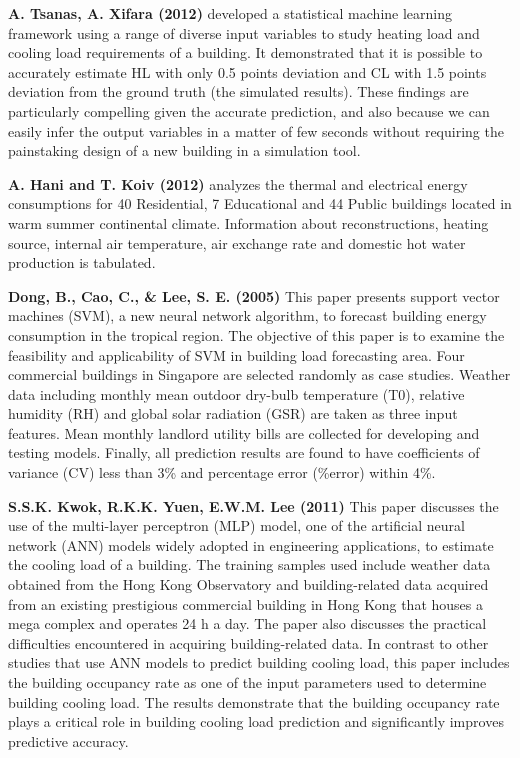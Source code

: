\textbf{A. Tsanas, A. Xifara (2012)} \cite{sanas2012xifara} developed a statistical machine learning framework using a range of diverse input variables to study heating load and cooling load requirements of a building. It demonstrated that it is possible to accurately estimate HL with only 0.5 points deviation and CL with 1.5 points deviation from the ground truth (the simulated results). These findings are particularly compelling given the accurate prediction, and also because we can easily infer the output variables in a matter of few seconds without requiring the painstaking design of a new building in a simulation tool.

\textbf{A. Hani and T. Koiv (2012)} \cite{hani2012koiv} analyzes the thermal and electrical energy consumptions for 40 Residential, 7 Educational and 44 Public buildings located in warm summer continental climate. Information about reconstructions, heating source, internal air temperature, air exchange rate and domestic hot water production is tabulated.

\textbf{Dong, B., Cao, C., \& Lee, S. E. (2005)} \cite{dong2005cao} This paper presents support vector machines (SVM), a new neural network algorithm, to forecast building energy consumption in the tropical region. The objective of this paper is to examine the feasibility and applicability of SVM in building load forecasting area. Four commercial buildings in Singapore are selected randomly as case studies. Weather data including monthly mean outdoor dry-bulb temperature (T0), relative humidity (RH) and global solar radiation (GSR) are taken as three input features. Mean monthly landlord utility bills are collected for developing and testing models. Finally, all prediction results are found to have coefficients of variance (CV) less than 3\% and percentage error (\%error) within 4\%.

\textbf{S.S.K. Kwok, R.K.K. Yuen, E.W.M. Lee (2011)} \cite{kwok2011yuen} This paper discusses the use of the multi-layer perceptron (MLP) model, one of the artificial neural network (ANN) models widely adopted in engineering applications, to estimate the cooling load of a building. The training samples used include weather data obtained from the Hong Kong Observatory and building-related data acquired from an existing prestigious commercial building in Hong Kong that houses a mega complex and operates 24 h a day. The paper also discusses the practical difficulties encountered in acquiring building-related data. In contrast to other studies that use ANN models to predict building cooling load, this paper includes the building occupancy rate as one of the input parameters used to determine building cooling load. The results demonstrate that the building occupancy rate plays a critical role in building cooling load prediction and significantly improves predictive accuracy.

